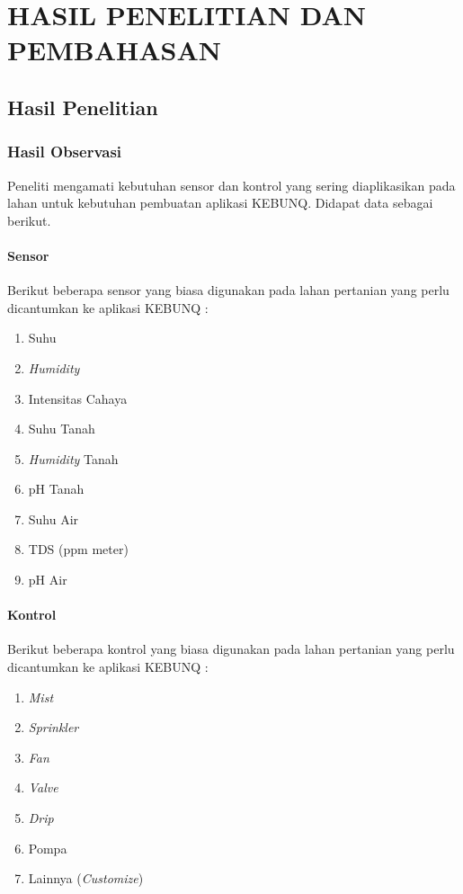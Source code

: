 \chapter{HASIL PENELITIAN DAN PEMBAHASAN}

%
\vspace{4.5pt}
\begin{flushleft}
    \begin{justify}
        \section{Hasil Penelitian}
        \subsection{Hasil Observasi}
        Peneliti mengamati kebutuhan sensor dan kontrol yang sering diaplikasikan pada lahan untuk kebutuhan pembuatan aplikasi KEBUNQ. Didapat data sebagai berikut.\\
        \subsubsection{Sensor} 
        Berikut beberapa sensor yang biasa digunakan pada lahan pertanian yang perlu dicantumkan ke aplikasi KEBUNQ :
        \begin{enumerate}
            \item Suhu
            \item \emph{Humidity}
            \item Intensitas Cahaya
            \item Suhu Tanah
            \item \emph{Humidity} Tanah
            \item pH Tanah
            \item Suhu Air
            \item TDS (ppm meter)
            \item pH Air\\
        \end{enumerate}
        \subsubsection{Kontrol}
        Berikut beberapa kontrol yang biasa digunakan pada lahan pertanian yang perlu dicantumkan ke aplikasi KEBUNQ :
        \begin{enumerate}
            \item \emph{Mist} 
            \item \emph{Sprinkler} 
            \item \emph{Fan} 
            \item \emph{Valve} 
            \item \emph{Drip} 
            \item Pompa 
            \item Lainnya (\emph{Customize})\\
        \end{enumerate}

\end{justify}
\end{flushleft}
